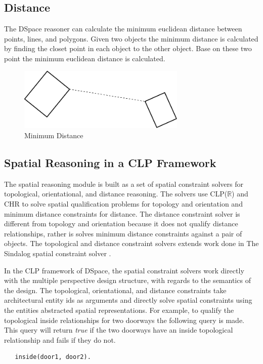 \documentclass[12pt]{ucthesis}
\begin{document}
\subsection{Distance}
The DSpace reasoner can calculate the minimum euclidean distance between points, lines, and polygons. Given two objects the minimum distance is calculated by finding the closet point in each object to the other object. Base on these two point the minimum euclidean distance is calculated. 

\begin{figure}[H]
\centering
\includegraphics[width=80mm]{min-dist}
\caption{Minimum Distance}
\label{min-dist}
\end{figure}

\subsection{Spatial Reasoning in a CLP Framework}
The spatial reasoning module is built as a set of spatial constraint solvers for topological, orientational, and distance reasoning. The solvers use CLP($\mathbb{R}$) and CHR to solve spatial qualification problems for topology and orientation and minimum distance constraints for distance. The distance constraint solver is different from topology and orientation because it does not qualify distance relationships, rather is solves minimum distance constraints against a pair of objects. The topological and distance constraint solvers extends work done in The Sindalog spatial constraint solver \cite{}. 

In the CLP framework of DSpace, the spatial constraint solvers work directly  with the multiple perspective design structure, with regards to the semantics of the design. The topological, orientational, and distance constraints take architectural entity ids as arguments and directly solve spatial constraints using the entities abstracted spatial representations. For example, to qualify the topological inside relationships for two doorways the following query is made. This query will return \emph{true} if the two doorways have an inside topological relationship and fails if they do not.
\begin{verbatim}
   inside(door1, door2).
\end{verbatim}
\end{document}
